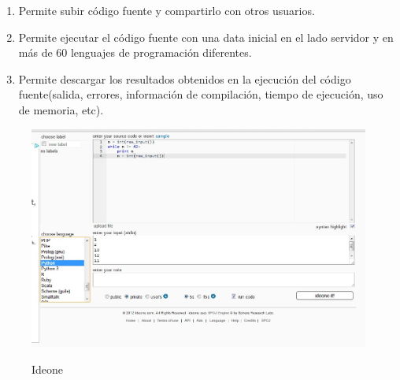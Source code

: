 \begin{enumerate}
  \item Permite subir código fuente y compartirlo con otros usuarios.
  \item Permite ejecutar el código fuente con una data inicial en el lado servidor y en más de 60 lenguajes de programación diferentes.
  \item Permite descargar los resultados obtenidos en la ejecución del código fuente(salida, errores, información de compilación, tiempo de ejecución, uso de memoria, etc).
\end{enumerate}
\begin{figure}[h]
  \centering
  \includegraphics[scale=0.5]{figuras/ideone.jpg}\\
  \caption[Ideone]{Ideone \protect\cite{ideone}}\label{fig:ideone}
\end{figure}

\newpage
